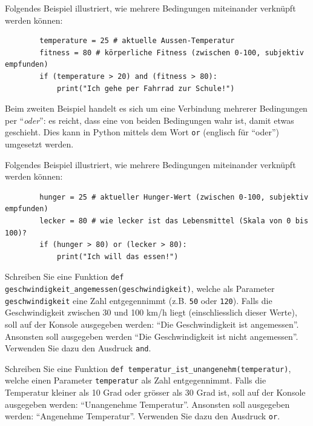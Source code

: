\begin{myexample}\label{example:fahrrad}
Folgendes Beispiel illustriert, wie mehrere Bedingungen miteinander verknüpft werden können:
\begin{lstlisting}
		temperature = 25 # aktuelle Aussen-Temperatur
		fitness = 80 # körperliche Fitness (zwischen 0-100, subjektiv empfunden)
		if (temperature > 20) and (fitness > 80):
			print("Ich gehe per Fahrrad zur Schule!")
	\end{lstlisting}
\end{myexample}

Beim zweiten Beispiel handelt es sich um eine Verbindung mehrerer Bedingungen per ``\textit{oder}'': es reicht, dass eine von beiden Bedingungen wahr ist, damit etwas geschieht. Dies kann in Python mittels dem Wort \lstinline|or| (englisch für ``oder'') umgesetzt werden.
\begin{myexample}
Folgendes Beispiel illustriert, wie mehrere Bedingungen miteinander verknüpft werden können:
\begin{lstlisting}
		hunger = 25 # aktueller Hunger-Wert (zwischen 0-100, subjektiv empfunden)
		lecker = 80 # wie lecker ist das Lebensmittel (Skala von 0 bis 100)?
		if (hunger > 80) or (lecker > 80):
			print("Ich will das essen!")
	\end{lstlisting}
\end{myexample}

\begin{myexercise}\label{ex:geschwindigkeitAngemessen}
	Schreiben Sie eine Funktion \lstinline|def geschwindigkeit_angemessen(geschwindigkeit)|, welche als Parameter \lstinline|geschwindigkeit| eine Zahl entgegennimmt (z.B. \lstinline|50| oder \lstinline|120|). Falls die Geschwindigkeit zwischen 30 und 100 km/h liegt (einschliesslich dieser Werte), soll auf der Konsole ausgegeben werden: ``Die Geschwindigkeit ist angemessen''. Ansonsten soll ausgegeben werden ``Die Geschwindigkeit ist nicht angemessen''. Verwenden Sie dazu den Ausdruck \lstinline|and|.
	\begin{myanswer}
		
	\end{myanswer}
\end{myexercise}

\begin{myexercise}\label{ex:tempUnangenehm}
	Schreiben Sie eine Funktion \lstinline|def temperatur_ist_unangenehm(temperatur)|, welche einen Parameter \lstinline|temperatur| als Zahl entgegennimmt. Falls die Temperatur kleiner als 10 Grad oder grösser als 30 Grad ist, soll auf der Konsole ausgegeben werden: ``Unangenehme Temperatur''. Ansonsten soll ausgegeben werden: ``Angenehme Temperatur''. Verwenden Sie dazu den Ausdruck \lstinline|or|.

	\begin{myanswer}
		
	\end{myanswer}
\end{myexercise}

